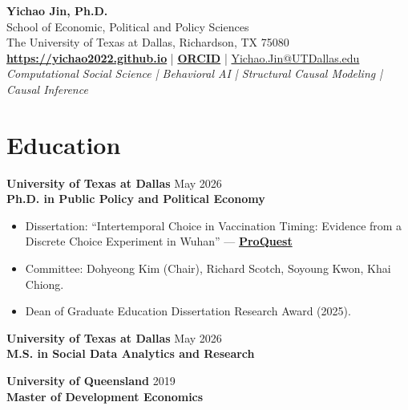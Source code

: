 \documentclass[11pt, letterpaper]{article}
\begin{document}
\thispagestyle{empty}
\pagestyle{empty}

\begin{center}
    {\huge \textbf{Yichao Jin, Ph.D.}} \\
    \vspace{0.5em}
    School of Economic, Political and Policy Sciences \\
    The University of Texas at Dallas, Richardson, TX 75080 \\
    \vspace{0.5em}
    \href{https://yichao2022.github.io}{\textbf{https://yichao2022.github.io}} \quad | \quad \href{https://orcid.org/0009-0003-7667-5143}{\textbf{ORCID}} \quad | \quad \href{mailto:Yichao.Jin@UTDallas.edu}{Yichao.Jin@UTDallas.edu} \\
    \vspace{0.5em}
    \textit{Computational Social Science \;|\; Behavioral AI \;|\; Structural Causal Modeling \;|\; Causal Inference}
\end{center}

\vspace{0.5em}
\noindent\hrulefill

\section*{Education}
\textbf{University of Texas at Dallas} \hfill May 2026 \\
\textbf{Ph.D. in Public Policy and Political Economy}
\begin{itemize}[noitemsep, topsep=0pt, label={-}]
    \item Dissertation: ``Intertemporal Choice in Vaccination Timing: Evidence from a Discrete Choice Experiment in Wuhan'' --- \href{https://www.proquest.com/docview/3354986484}{\textbf{ProQuest}}
    \item Committee: Dohyeong Kim (Chair), Richard Scotch, Soyoung Kwon, Khai Chiong.
    \item Dean of Graduate Education Dissertation Research Award (2025).
\end{itemize}

\vspace{0.5em}
\noindent \textbf{University of Texas at Dallas} \hfill May 2026 \\
\textbf{M.S. in Social Data Analytics and Research}

\vspace{0.5em}
\noindent \textbf{University of Queensland} \hfill 2019 \\
\textbf{Master of Development Economics}
\end{document}
